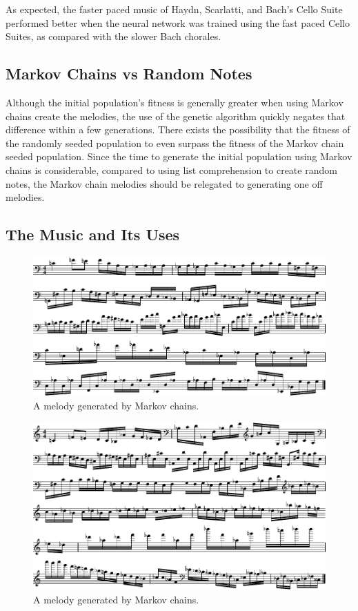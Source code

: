 As expected, the faster paced music of Haydn, Scarlatti, and Bach's Cello Suite performed better when the neural network was trained using the fast paced Cello Suites, as compared with the slower Bach chorales.

\subsection{Markov Chains vs Random Notes}
Although the initial population's fitness is generally greater when using Markov chains create the melodies, the use of the genetic algorithm quickly negates that difference within a few generations.
There exists the possibility that the fitness of the randomly seeded population to even surpass the fitness of the Markov chain seeded population.
Since the time to generate the initial population using Markov chains is considerable, compared to using list comprehension to create random notes, the Markov chain melodies should be relegated to generating one off melodies.

\subsection{The Music and Its Uses}

\begin{figure}[h]
	\centering
	\includegraphics[width=\linewidth]{figures/markov_melody_1.pdf}
	\caption{A melody generated by Markov chains.}
	\label{fig:music:markov1}
\end{figure}

\begin{figure}[h]
	\centering
	\includegraphics[width=\linewidth]{figures/markov_melody_2.pdf}
	\caption{A melody generated by Markov chains.}
	\label{fig:music:markov2}
\end{figure}


